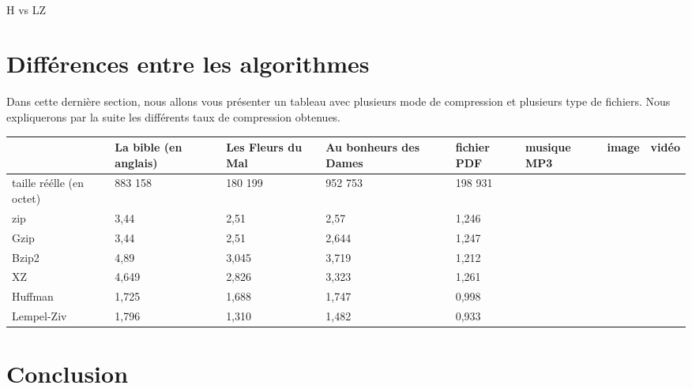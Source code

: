 \documentclass{report}
\begin{document}
\paragraph*{}
H vs LZ

\section*{Différences entre les algorithmes}
Dans cette dernière section, nous allons vous présenter un tableau avec plusieurs mode de compression et plusieurs type de fichiers. 
Nous expliquerons par la suite les différents taux de compression obtenues. 


\begin{flushleft}
{\renewcommand{\arraystretch}{2}
\begin{tabular}{|p{1.5cm}|p{1.5cm}|p{1.5cm}|p{1.5cm}|p{1.5cm}|p{1.5cm}|p{1.5cm}|p{1.5cm}|}
\hline
 & La bible (en anglais)  & Les Fleurs du Mal  & Au bonheurs des Dames & fichier PDF & musique  MP3 & image & vidéo\\
\hline
taille réélle (en octet)  & 883 158 & 180 199 & 952 753 & 198 931 & & & \\\hline
zip & 3,44 & 2,51 & 2,57 & 1,246 & & & \\
\hline
Gzip & 3,44 & 2,51 & 2,644 & 1,247 & & & \\
\hline
Bzip2 & 4,89 & 3,045 & 3,719 & 1,212 & & & \\
\hline
XZ & 4,649 & 2,826 & 3,323 & 1,261 & & & \\
\hline
Huffman & 1,725 & 1,688 & 1,747 & 0,998 & & & \\
\hline
Lempel-Ziv & 1,796 & 1,310 & 1,482 & 0,933 & & & \\
\hline

\end{tabular}
}
\end{flushleft}

\section*{Conclusion}
\end{document}
